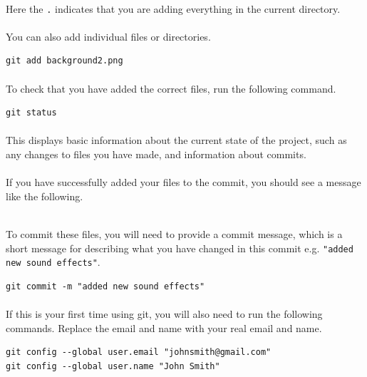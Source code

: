 \documentclass[11pt]{article}
\begin{document}
\paragraph{}
Here the \lstinline{.} indicates that you are adding everything in the current directory.
\paragraph{}
You can also add individual files or directories.
\begin{lstlisting}
git add background2.png
\end{lstlisting}
\paragraph{}
To check that you have added the correct files, run the following command.
\begin{lstlisting}
git status
\end{lstlisting}
\paragraph{}
This displays basic information about the current state of the project, such as any changes to files you have made, and information about commits.
\paragraph{}
If you have successfully added your files to the commit, you should see a message like the following.
\begin{lstlisting}

\end{lstlisting}
\paragraph{}
To commit these files, you will need to provide a commit message, which is a short message for describing what you have changed in this commit e.g. \lstinline{"added new sound effects"}.
\begin{lstlisting}
git commit -m "added new sound effects"
\end{lstlisting}
\paragraph{}
If this is your first time using git, you will also need to run the following commands. Replace the email and name with your real email and name.
\begin{lstlisting}
git config --global user.email "johnsmith@gmail.com"
git config --global user.name "John Smith"
\end{lstlisting}
\end{document}
